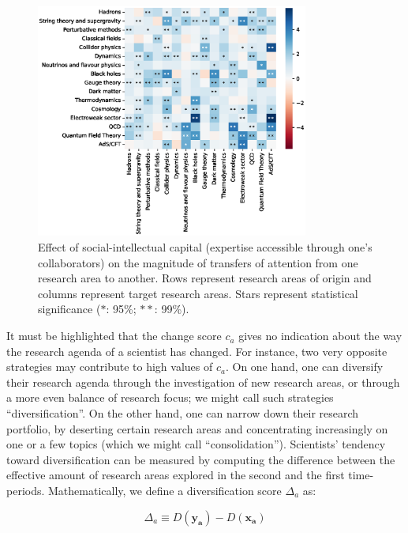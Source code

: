 \documentclass{article}
\begin{document}
\begin{figure}
    \centering
    \includegraphics[width=0.8\textwidth]{plots/ei_delta_control.eps}
    \caption{Effect of social-intellectual capital (expertise accessible through one's collaborators) on the magnitude of transfers of attention from one research area to another. Rows represent research areas of origin and columns represent target research areas. Stars represent statistical significance ($\ast$: 95\%; $\ast\ast$: 99\%).}
    \label{fig:social-capital-effect}
\end{figure}

It must be highlighted that the change score $c_a$ gives no indication about the way the research agenda of a scientist has changed. For instance, two very opposite strategies may contribute to high values of $c_a$. On one hand, one can diversify their research agenda through the investigation of new research areas, or through a more even balance of research focus; we might call such strategies ``diversification''. On the other hand, one can narrow down their research portfolio, by deserting certain research areas and concentrating increasingly on one or a few topics (which we might call ``consolidation''). Scientists' tendency toward diversification can be measured by computing the difference between the effective amount of research areas explored in the second and the first time-periods. Mathematically, we define a diversification score $\Delta_a$ as:

\begin{equation}
    \Delta_a \equiv D(\bm{y_a})-D(\bm{x_a})
\end{equation}
\end{document}
